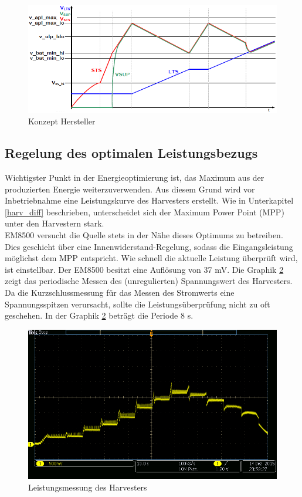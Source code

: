 \begin{figure}
   \includegraphics{2TheoretischeGrundlagen/imag/KonzeptFirma.png}
   \caption{Konzept Hersteller }\label{energiespeisung_lts} 
\end{figure}


\subsection{Regelung des optimalen Leistungsbezugs}

Wichtigster Punkt in der Energieoptimierung ist, das Maximum aus der produzierten Energie weiterzuverwenden. Aus diesem Grund wird vor Inbetriebnahme eine Leistungskurve des Harvesters erstellt. Wie in Unterkapitel \ref{harv_diff} beschrieben, unterscheidet sich der Maximum Power Point (MPP) unter den Harvestern stark.\\ 

EM8500 versucht die Quelle stets in der Nähe dieses Optimums zu betreiben. Dies geschieht über eine Innenwiderstand-Regelung, sodass die Eingangsleistung möglichst dem MPP entspricht. Wie schnell die aktuelle Leistung überprüft wird, ist einstellbar. Der EM8500 besitzt eine Auflösung von 37 mV. Die Graphik \ref{RegelungSpannung} zeigt das periodische Messen des (unregulierten) Spannungswert des Harvesters. Da die Kurzschlussmessung für das Messen des Stromwerts eine Spannungsspitzen verursacht, sollte die Leistungsüberprüfung nicht zu oft geschehen. In der Graphik \ref{RegelungSpannung} beträgt die Periode 8 s.

\begin{figure}    
    \includegraphics{2TheoretischeGrundlagen/imag/RegelungVHRV.png}
    \caption{Leistungsmessung des Harvesters}\label{RegelungSpannung} 
\end{figure}



